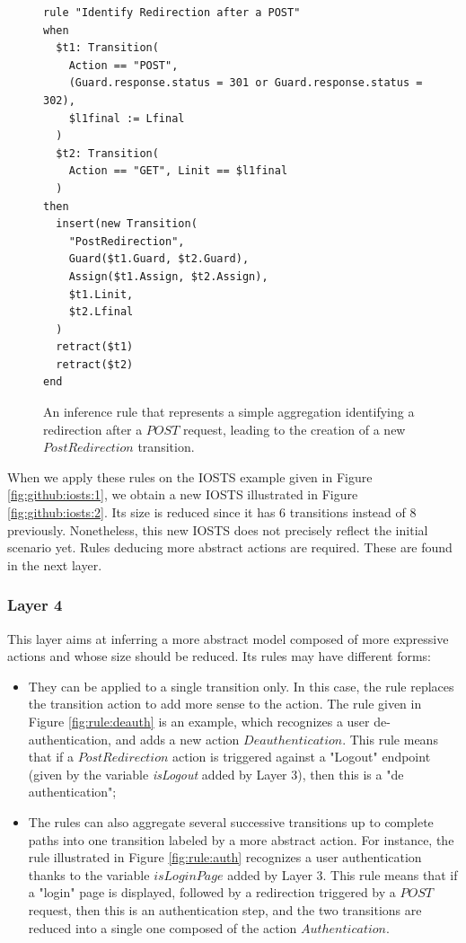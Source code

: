 \begin{figure}[h]
\begin{framed}
\begin{BVerbatim}
rule "Identify Redirection after a POST"
when
  $t1: Transition(
    Action == "POST",
    (Guard.response.status = 301 or Guard.response.status = 302),
    $l1final := Lfinal
  )
  $t2: Transition(
    Action == "GET", Linit == $l1final
  )
then
  insert(new Transition(
    "PostRedirection",
    Guard($t1.Guard, $t2.Guard),
    Assign($t1.Assign, $t2.Assign),
    $t1.Linit,
    $t2.Lfinal
  )
  retract($t1)
  retract($t2)
end
\end{BVerbatim}
\end{framed}

\caption{An inference rule that represents a simple aggregation
identifying a redirection after a $POST$ request, leading to the
creation of a new $PostRedirection$ transition.}
\label{fig:rule:redirect}
\end{figure}

\begin{example}
When we apply these rules on the IOSTS example given in Figure
\ref{fig:github:iosts:1}, we obtain a new IOSTS illustrated in
Figure \ref{fig:github:iosts:2}. Its size is reduced since it has
6 transitions instead of 8 previously. Nonetheless, this new
IOSTS does not precisely reflect the initial scenario yet. Rules
deducing more abstract actions are required. These are found in
the next layer.
\end{example}

\subsubsection{Layer 4}

This layer aims at inferring a more abstract model composed of
more expressive actions and whose size should be reduced. Its
rules may have different forms:

\begin{itemize}
\item They can be applied to a single transition only. In this
case, the rule replaces the transition action to add more sense
to the action. The rule given in Figure \ref{fig:rule:deauth} is
an example, which recognizes a user de-authentication, and adds a
new action $Deauthentication$. This rule means that if a
$PostRedirection$ action is triggered against a "Logout" endpoint
(given by the variable \textit{isLogout} added by Layer 3), then
this is a "de authentication";

\item The rules can also aggregate several successive transitions
up to complete paths into one transition labeled by a more
abstract action. For instance, the rule illustrated in Figure
\ref{fig:rule:auth} recognizes a user authentication thanks to
the variable $isLoginPage$ added by Layer 3. This rule means that
if a "login" page is displayed, followed by a redirection
triggered by a $POST$ request, then this is an authentication
step, and the two transitions are reduced into a single one
composed of the action $Authentication$.
\end{itemize}

